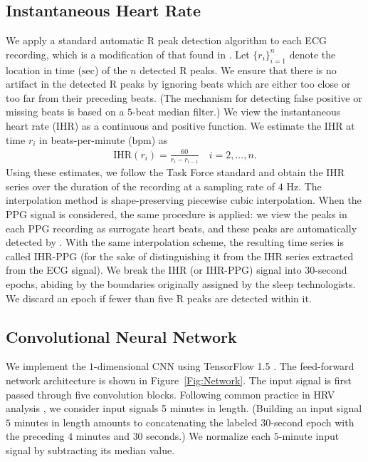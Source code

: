 \documentclass[10pt,a4paper,english]{amsart}
\begin{document}
\subsection{Instantaneous Heart Rate}

We apply a standard automatic R peak detection algorithm to each ECG recording, which is a modification of that found in \cite{elgendi:qrs}. Let $\{r_i\}_{i=1}^n$ denote the location in time ($\mathrm{sec}$) of the $n$ detected R peaks. 
%
We ensure that there is no artifact in the detected R peaks by ignoring beats which are either too close or too far from their preceding beats. (The mechanism for detecting false positive or missing beats is based on a $5$-beat median filter.) We view the instantaneous heart rate (IHR) as a continuous and positive function.  We estimate the IHR at time $r_i$ in beats-per-minute ($\mathrm{bpm}$) as 
\begin{gather}
\mathrm{IHR}\left( r_i \right) = \frac{60}{r_i - r_{i-1}} \quad i = 2,...,n.
\end{gather}
Using these estimates, we follow the Task Force standard \cite{Electrophysiology1043} and obtain the IHR series over the duration of the recording at a sampling rate of $4$ Hz. The interpolation method is shape-preserving piecewise cubic interpolation.
%
When the PPG signal is considered, the same procedure is applied: we view the peaks in each PPG recording as surrogate heart beats, and these peaks are automatically detected by \cite{Elgendi2013ppg}. With the same interpolation scheme, the resulting time series is called IHR-PPG (for the sake of distinguishing it from the IHR series extracted from the ECG signal).
%
%
We break the IHR (or IHR-PPG) signal into $30$-second epochs, abiding by the boundaries originally assigned by the sleep technologists. We discard an epoch if fewer than five R peaks are detected within it. 

\subsection{Convolutional Neural Network}

We implement the $1$-dimensional CNN using TensorFlow 1.5 \cite{tensorflow2015-whitepaper}.
The feed-forward network architecture is shown in Figure~\ref{Fig:Network}. 
The input signal is first passed through five convolution blocks. Following common practice in HRV analysis \cite{Engoren:1998,Casaseca-de-la-Higuera_Martin-Fernandez_Alberola-Lopez:2006}, we consider input signals 5 minutes in length.  (Building an input signal $5$ minutes in length amounts to concatenating the labeled $30$-second epoch with the preceding $4$ minutes and $30$ seconds.) We normalize each $5$-minute input signal by subtracting its median value.
\end{document}
